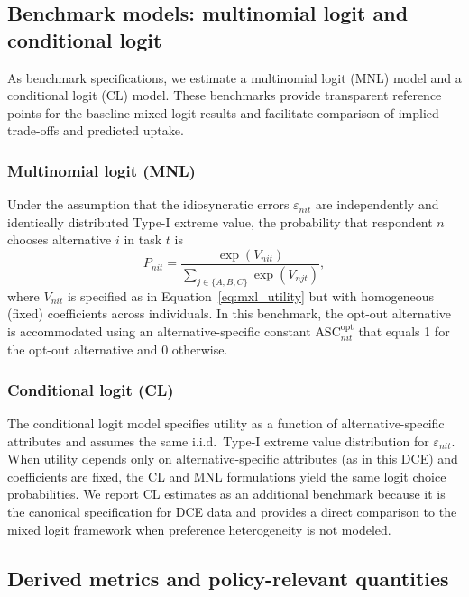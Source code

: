 \documentclass[doublespacing]{utdthesis}
\begin{document}
\subsection{Benchmark models: multinomial logit and conditional logit}
\label{subsec:benchmark_mnl_cl}

As benchmark specifications, we estimate a multinomial logit (MNL) model and a conditional logit (CL) model. These benchmarks provide transparent reference points for the baseline mixed logit results and facilitate comparison of implied trade-offs and predicted uptake.

\subsubsection{Multinomial logit (MNL)}
\label{subsec:mnl}
Under the assumption that the idiosyncratic errors $\varepsilon_{nit}$ are independently and identically distributed Type-I extreme value, the probability that respondent $n$ chooses alternative $i$ in task $t$ is
\begin{equation}
P_{nit} =
\frac{\exp(V_{nit})}{\sum_{j \in \{A,B,C\}} \exp(V_{njt})},
\end{equation}
where $V_{nit}$ is specified as in Equation~\eqref{eq:mxl_utility} but with homogeneous (fixed) coefficients across individuals. In this benchmark, the opt-out alternative is accommodated using an alternative-specific constant $\text{ASC}^{\text{opt}}_{nit}$ that equals 1 for the opt-out alternative and 0 otherwise.

\subsubsection{Conditional logit (CL)}
\label{subsec:cl}
The conditional logit model specifies utility as a function of alternative-specific attributes and assumes the same i.i.d.\ Type-I extreme value distribution for $\varepsilon_{nit}$. When utility depends only on alternative-specific attributes (as in this DCE) and coefficients are fixed, the CL and MNL formulations yield the same logit choice probabilities. We report CL estimates as an additional benchmark because it is the canonical specification for DCE data and provides a direct comparison to the mixed logit framework when preference heterogeneity is not modeled.

\subsection{Derived metrics and policy-relevant quantities}
\label{subsec:derived_metrics}
\end{document}
